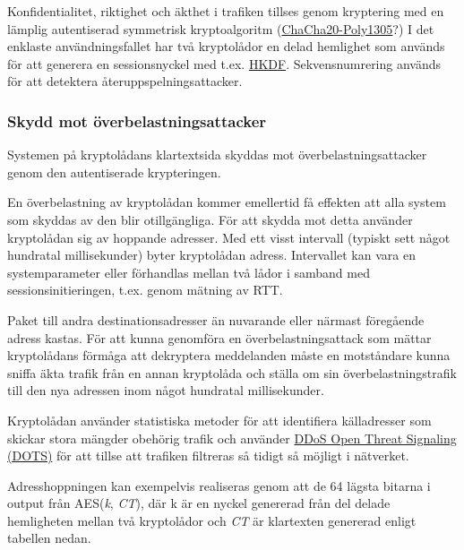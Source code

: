 \documentclass[12pt,a4paper]{article}
\begin{document}
Konfidentialitet, riktighet och äkthet i trafiken tillses genom
kryptering med en lämplig autentiserad symmetrisk kryptoalgoritm
(\href{https://en.wikipedia.org/wiki/ChaCha20-Poly1305}{ChaCha20-Poly1305}?)
I det enklaste användningsfallet har två kryptolådor en delad hemlighet
som används för att generera en sessionsnyckel med t.ex.
\href{https://en.wikipedia.org/wiki/HKDF}{HKDF}. Sekvensnumrering
används för att detektera återuppspelningsattacker.

\subsubsection{Skydd mot
överbelastningsattacker}\label{skydd-mot-uxf6verbelastningsattacker}

Systemen på kryptolådans klartextsida skyddas mot
överbelastningsattacker genom den autentiserade krypteringen.

En överbelastning av kryptolådan kommer emellertid få effekten att alla
system som skyddas av den blir otillgängliga. För att skydda mot detta
använder kryptolådan sig av hoppande adresser. Med ett visst intervall
(typiskt sett något hundratal millisekunder) byter kryptolådan adress.
Intervallet kan vara en systemparameter eller förhandlas mellan två
lådor i samband med sessionsinitieringen, t.ex. genom mätning av RTT.

Paket till andra destinationsadresser än nuvarande eller närmast
föregående adress kastas. För att kunna genomföra en
överbelastningsattack som mättar kryptolådans förmåga att dekryptera
meddelanden måste en motståndare kunna sniffa äkta trafik från en annan
kryptolåda och ställa om sin överbelastningstrafik till den nya adressen
inom något hundratal millisekunder.

Kryptolådan använder statistiska metoder för att identifiera
källadresser som skickar stora mängder obehörig trafik och använder
\href{https://datatracker.ietf.org/doc/rfc9244/}{DDoS Open Threat
Signaling (DOTS)} för att tillse att trafiken filtreras så tidigt så
möjligt i nätverket.

Adresshoppningen kan exempelvis realiseras genom att de 64 lägsta
bitarna i output från AES(\emph{k}, \emph{CT}), där k är en nyckel
genererad från del delade hemligheten mellan två kryptolådor och
\emph{CT} är klartexten genererad enligt tabellen nedan.
\end{document}
